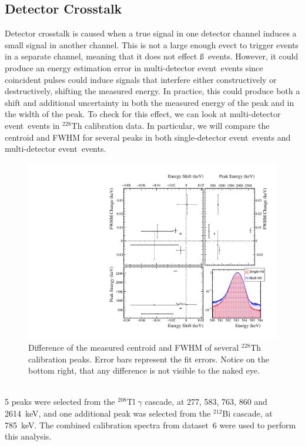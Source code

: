 \documentclass[notitlepage,rmp,aps,10pt]{revtex4-1}
\newcommand{\iso}[2]{$^{#1}$#2}
\newcommand{\Th}[1]{\iso{#1}{Th}}
\newcommand{\Tl}[1]{\iso{#1}{Tl}}
\newcommand{\Bi}[1]{\iso{#1}{Bi}}
\newcommand{\sd}{single-detector event}
\newcommand{\md}{multi-detector event}
\begin{document}
\subsection{Detector Crosstalk}
Detector crosstalk is caused when a true signal in one detector channel induces a small signal in another channel.
This is not a large enough evect to trigger events in a separate channel, meaning that it does not effect \ss\ events.
However, it could produce an energy estimation error in \md\ events since coincident pulses could induce signals that interfere either constructively or destructively, shifting the measured energy.
In practice, this could produce both a shift and additional uncertainty in both the measured energy of the peak and in the width of the peak.
To check for this effect, we can look at \md\ events in \Th{228} calibration data.
In particular, we will compare the centroid and FWHM for several peaks in both \sd\ events and \md\ events.
\begin{figure}[h]
  \centering
  \includegraphics[width=\linewidth]{xtalkplot}
  \caption[Peak shape comparison for single- and multi-detector events]{\label{fig:xtalk}
    Difference of the measured centroid and FWHM of several \Th{228} calibration peaks. Error bars represent the fit errors. Notice on the bottom right, that any difference is not visible to the naked eye.
  }
\end{figure}
\\
5 peaks were selected from the \Tl{208} $\gamma$ cascade, at 277, 583, 763, 860 and 2614~keV, and one additional peak was selected from the \Bi{212} cascade, at 785~keV.
The combined calibration spectra from dataset~6 were used to perform this analysis.
\end{document}
